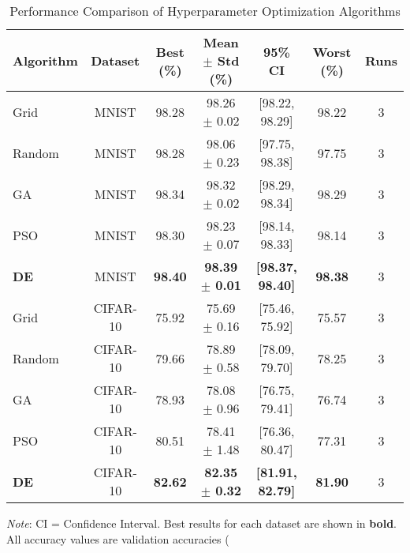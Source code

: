 \begin{table}[htbp]
\centering
\caption{Performance Comparison of Hyperparameter Optimization Algorithms}
\label{tab:main_results}
\begin{tabular}{lcccccc}
\toprule
\textbf{Algorithm} & \textbf{Dataset} & \textbf{Best (\%)} & \textbf{Mean $\pm$ Std (\%)} & \textbf{95\% CI} & \textbf{Worst (\%)} & \textbf{Runs} \\
\midrule
Grid & MNIST & 98.28 & 98.26 $\pm$ 0.02 & [98.22, 98.29] & 98.22 & 3 \\
Random & MNIST & 98.28 & 98.06 $\pm$ 0.23 & [97.75, 98.38] & 97.75 & 3 \\
GA & MNIST & 98.34 & 98.32 $\pm$ 0.02 & [98.29, 98.34] & 98.29 & 3 \\
PSO & MNIST & 98.30 & 98.23 $\pm$ 0.07 & [98.14, 98.33] & 98.14 & 3 \\
\textbf{DE} & MNIST & \textbf{98.40} & \textbf{98.39 $\pm$ 0.01} & \textbf{[98.37, 98.40]} & \textbf{98.38} & 3 \\
\midrule
Grid & CIFAR-10 & 75.92 & 75.69 $\pm$ 0.16 & [75.46, 75.92] & 75.57 & 3 \\
Random & CIFAR-10 & 79.66 & 78.89 $\pm$ 0.58 & [78.09, 79.70] & 78.25 & 3 \\
GA & CIFAR-10 & 78.93 & 78.08 $\pm$ 0.96 & [76.75, 79.41] & 76.74 & 3 \\
PSO & CIFAR-10 & 80.51 & 78.41 $\pm$ 1.48 & [76.36, 80.47] & 77.31 & 3 \\
\textbf{DE} & CIFAR-10 & \textbf{82.62} & \textbf{82.35 $\pm$ 0.32} & \textbf{[81.91, 82.79]} & \textbf{81.90} & 3 \\
\bottomrule
\end{tabular}
\vspace{2mm}
\begin{minipage}{\textwidth}
\small
\textit{Note}: CI = Confidence Interval. Best results for each dataset are shown in \textbf{bold}. All accuracy values are validation accuracies (\\%
\end{minipage}
\end{table}
